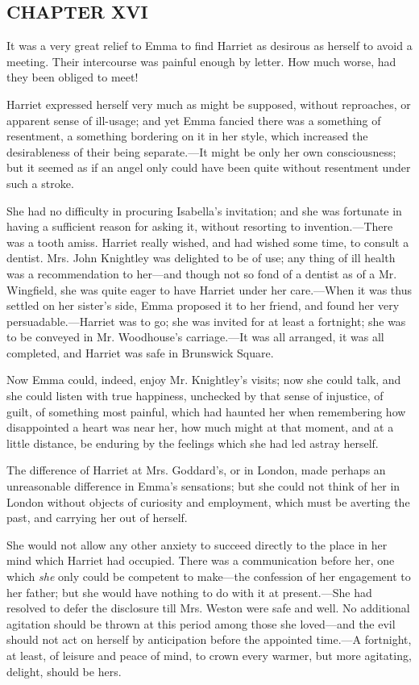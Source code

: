 \subsection[chapter-xvi-2]{\useURL[url54][][][]\from[url54]CHAPTER XVI}

It was a very great relief to Emma to find Harriet as desirous as herself to avoid a meeting. Their intercourse was painful enough by letter. How much worse, had they been obliged to meet!

Harriet expressed herself very much as might be supposed, without reproaches, or apparent sense of ill-usage; and yet Emma fancied there was a something of resentment, a something bordering on it in her style, which increased the desirableness of their being separate.---It might be only her own consciousness; but it seemed as if an angel only could have been quite without resentment under such a stroke.

She had no difficulty in procuring Isabella's invitation; and she was fortunate in having a sufficient reason for asking it, without resorting to invention.---There was a tooth amiss. Harriet really wished, and had wished some time, to consult a dentist. Mrs. John Knightley was delighted to be of use; any thing of ill health was a recommendation to her---and though not so fond of a dentist as of a Mr. Wingfield, she was quite eager to have Harriet under her care.---When it was thus settled on her sister's side, Emma proposed it to her friend, and found her very persuadable.---Harriet was to go; she was invited for at least a fortnight; she was to be conveyed in Mr. Woodhouse's carriage.---It was all arranged, it was all completed, and Harriet was safe in Brunswick Square.

Now Emma could, indeed, enjoy Mr. Knightley's visits; now she could talk, and she could listen with true happiness, unchecked by that sense of injustice, of guilt, of something most painful, which had haunted her when remembering how disappointed a heart was near her, how much might at that moment, and at a little distance, be enduring by the feelings which she had led astray herself.

The difference of Harriet at Mrs. Goddard's, or in London, made perhaps an unreasonable difference in Emma's sensations; but she could not think of her in London without objects of curiosity and employment, which must be averting the past, and carrying her out of herself.

She would not allow any other anxiety to succeed directly to the place in her mind which Harriet had occupied. There was a communication before her, one which {\em she} only could be competent to make---the confession of her engagement to her father; but she would have nothing to do with it at present.---She had resolved to defer the disclosure till Mrs. Weston were safe and well. No additional agitation should be thrown at this period among those she loved---and the evil should not act on herself by anticipation before the appointed time.---A fortnight, at least, of leisure and peace of mind, to crown every warmer, but more agitating, delight, should be hers.

